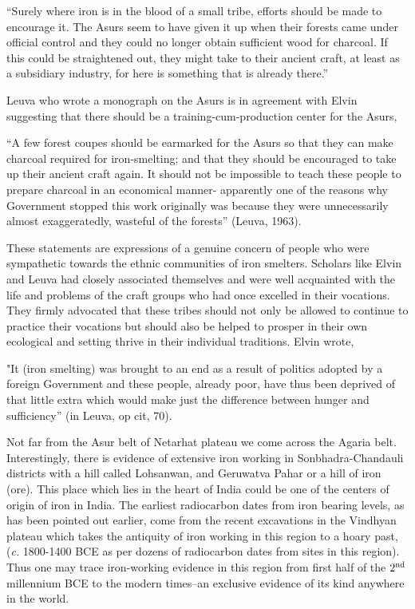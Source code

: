“Surely where iron is in the blood of a small tribe, efforts should be made to encourage it. The Asurs seem to have given it up when their forests came under official control and they could no longer obtain sufficient wood for charcoal. If this could be straightened out, they might take to their ancient craft, at least as a subsidiary industry, for here is something that is already there.” 

Leuva who wrote a monograph on the Asurs is in agreement with Elvin suggesting that there should be a training-cum-production center for the Asurs, 

“A few forest coupes should be earmarked for the Asurs so that they can make charcoal required for iron-smelting; and that they should be encouraged to take up their ancient craft again. It should not be impossible to teach these people to prepare charcoal in an economical manner- apparently one of the reasons why Government stopped this work originally was because they were unnecessarily almost exaggeratedly, wasteful of the forests” (Leuva, 1963).

These statements are expressions of a genuine concern of people who were sympathetic towards the ethnic communities of iron smelters. Scholars like Elvin and Leuva had closely associated themselves and were well acquainted with the life and problems of the craft groups who had once excelled in their vocations. They firmly advocated that these tribes should not only be allowed to continue to practice their vocations but should also be helped to prosper in their own ecological and setting thrive in their individual traditions. Elvin wrote,

 "It (iron smelting) was brought to an end as a result of politics adopted by a foreign Government and these people, already poor, have thus been deprived of that little extra which would make just the difference between hunger and sufficiency” (in Leuva, op cit, 70).

Not far from the Asur belt of Netarhat plateau we come across the Agaria belt. Interestingly, there is evidence of extensive iron working in Sonbhadra-Chandauli districts with a hill called Lohsanwan, and Geruwatva Pahar or a hill of iron (ore). This place which lies in the heart of India could be one of the centers of origin of iron in India. The earliest radiocarbon dates from iron bearing levels, as has been pointed out earlier, come from the recent excavations in the Vindhyan plateau which takes the antiquity of iron working in this region to a hoary past, ({\it c.} 1800-1400 BCE as per dozens of radiocarbon dates from sites in this region). Thus one may trace iron-working evidence in this region from first half of the $2^{\rm nd}$ millennium BCE to the modern times–an exclusive evidence of its kind anywhere in the world. 

